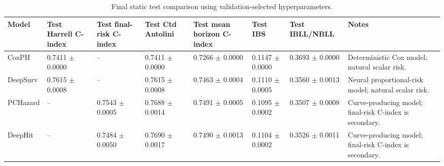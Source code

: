 \begin{table}
\caption{Final static test comparison using validation-selected hyperparameters.}
\label{tab:static_final_test_comparison}
\begin{tabular}{llllllll}
\toprule
Model & Test Harrell C-index & Test final-risk C-index & Test Ctd Antolini & Test mean horizon C-index & Test IBS & Test IBLL/NBLL & Notes \\
\midrule
CoxPH & 0.7411 $\pm$ 0.0000 & -- & 0.7411 $\pm$ 0.0000 & 0.7266 $\pm$ 0.0000 & 0.1147 $\pm$ 0.0000 & 0.3693 $\pm$ 0.0000 & Deterministic Cox model; natural scalar risk. \\
DeepSurv & 0.7615 $\pm$ 0.0008 & -- & 0.7615 $\pm$ 0.0008 & 0.7463 $\pm$ 0.0004 & 0.1110 $\pm$ 0.0005 & 0.3560 $\pm$ 0.0013 & Neural proportional-risk model; natural scalar risk. \\
PCHazard & -- & 0.7543 $\pm$ 0.0005 & 0.7688 $\pm$ 0.0014 & 0.7491 $\pm$ 0.0005 & 0.1095 $\pm$ 0.0002 & 0.3507 $\pm$ 0.0008 & Curve-producing model; final-risk C-index is secondary. \\
DeepHit & -- & 0.7484 $\pm$ 0.0050 & 0.7690 $\pm$ 0.0017 & 0.7490 $\pm$ 0.0013 & 0.1104 $\pm$ 0.0002 & 0.3526 $\pm$ 0.0011 & Curve-producing model; final-risk C-index is secondary. \\
\bottomrule
\end{tabular}
\end{table}
